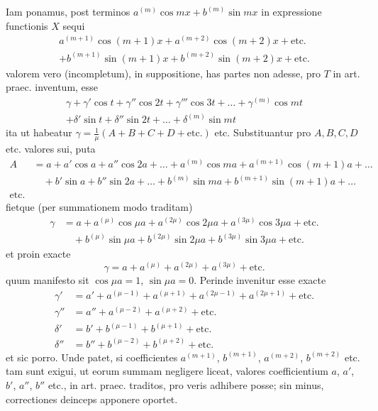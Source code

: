 \documentclass[12pt,a4paper]{article}
\theoremstyle{plain}
\begin{document}
Iam ponamus, post terminos $a^{(m)}\cos mx + b^{(m)}\sin mx$ in expressione functionis
$X$ sequi
\begin{gather*}
a^{(m+1)}\cos(m+1)x + a^{(m+2)}\cos(m+2)x + \text{etc.}\\
+ b^{(m+1)}\sin(m+1)x + b^{(m+2)}\sin(m+2)x + \text{etc.}
\end{gather*}
valorem vero (incompletum), in suppositione, has partes non adesse, pro $T$ in
art. praec. inventum, esse
\begin{multline*}
\gamma + \gamma'\cos t + \gamma''\cos 2t + \gamma'''\cos 3t + \ldots + \gamma^{(m)}\cos mt\\
+ \delta'\sin t + \delta''\sin 2t + \ldots + \delta^{(m)}\sin mt
\end{multline*}
ita ut habeatur $\gamma = \frac{1}{\mu}(A + B + C + D + \text{etc.})$ etc.
Substituantur pro $A, B, C, D$ etc. valores sui, puta
\begin{align*} A &= a + a'\cos a + a''\cos 2a + \ldots + a^{(m)}\cos ma + a^{(m+1)}\cos(m+1)a + \ldots\\
&\quad + b'\sin a + b''\sin 2a + \ldots + b^{(m)}\sin ma + b^{(m+1)}\sin(m+1)a + \ldots\\
\text{etc.}
\end{align*}
fietque (per summationem modo traditam)
\begin{align*}
\gamma &= a + a^{(\mu)}\cos\mu a + a^{(2\mu)}\cos 2\mu a + a^{(3\mu)}\cos 3\mu a + \text{etc.}\\
&\quad + b^{(\mu)}\sin\mu a + b^{(2\mu)}\sin 2\mu a + b^{(3\mu)}\sin 3\mu a + \text{etc.}
\end{align*}
et proin exacte
\[
\gamma = a + a^{(\mu)} + a^{(2\mu)} + a^{(3\mu)} + \text{etc.}
\]
quum manifesto sit $\cos\mu a = 1$, $\sin\mu a = 0$. Perinde invenitur esse exacte
\begin{align*}
\gamma' &= a' + a^{(\mu-1)} + a^{(\mu+1)} + a^{(2\mu-1)} + a^{(2\mu+1)} + \text{etc.}\\
\gamma'' &= a'' + a^{(\mu-2)} + a^{(\mu+2)} + \text{etc.}\\
\delta' &= b' + b^{(\mu-1)} + b^{(\mu+1)} + \text{etc.}\\
\delta'' &= b'' + b^{(\mu-2)} + b^{(\mu+2)} + \text{etc.}
\end{align*}
et sic porro. Unde patet, si coefficientes $a^{(m+1)}$, $b^{(m+1)}$, $a^{(m+2)}$, $b^{(m+2)}$ etc. tam sunt exigui, ut eorum summam negligere liceat, valores coefficientium $a$, $a'$, $b'$, $a''$, $b''$ etc., in art. praec. traditos, pro veris adhibere posse; sin minus, correctiones
deinceps apponere oportet.
\end{document}
